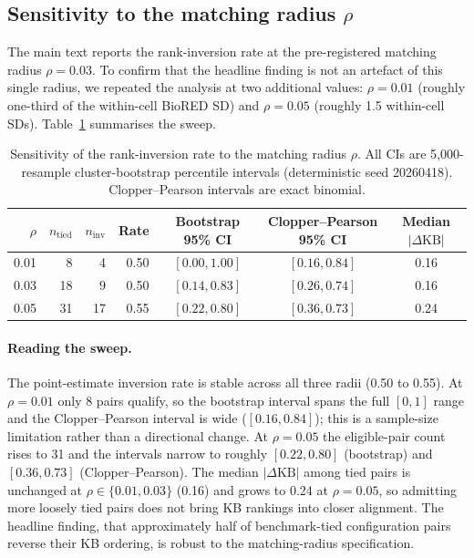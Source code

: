 \subsection{Sensitivity to the matching radius $\rho$}
\label{supp:rho-sweep}

The main text reports the rank-inversion rate at the
pre-registered matching radius $\rho = 0.03$. To confirm that the
headline finding is not an artefact of this single radius, we
repeated the analysis at two additional values: $\rho = 0.01$
(roughly one-third of the within-cell BioRED SD) and $\rho = 0.05$
(roughly 1.5 within-cell SDs). Table~\ref{tab:s8-rho-sweep}
summarises the sweep.

\begin{table}[H]
\centering
\caption{Sensitivity of the rank-inversion rate to the
matching radius $\rho$. All CIs are 5{,}000-resample
cluster-bootstrap percentile intervals (deterministic seed
20260418). Clopper--Pearson intervals are exact binomial.}
\label{tab:s8-rho-sweep}
\small
\begin{tabular}{@{}rrrrccc@{}}
\toprule
\textbf{$\rho$} & \textbf{$n_\text{tied}$}
& \textbf{$n_\text{inv}$} & \textbf{Rate}
& \textbf{Bootstrap 95\% CI}
& \textbf{Clopper--Pearson 95\% CI}
& \textbf{Median $|\Delta\text{KB}|$} \\
\midrule
0.01 &  8 &  4 & 0.50 & $[0.00, 1.00]$ & $[0.16, 0.84]$ & 0.16 \\
0.03 & 18 &  9 & 0.50 & $[0.14, 0.83]$ & $[0.26, 0.74]$ & 0.16 \\
0.05 & 31 & 17 & 0.55 & $[0.22, 0.80]$ & $[0.36, 0.73]$ & 0.24 \\
\bottomrule
\end{tabular}
\end{table}

\paragraph{Reading the sweep.}
The point-estimate inversion rate is stable across all three radii
(0.50 to 0.55). At $\rho = 0.01$ only 8 pairs qualify, so the
bootstrap interval spans the full $[0, 1]$ range and the
Clopper--Pearson interval is wide ($[0.16, 0.84]$); this is a
sample-size limitation rather than a directional change. At
$\rho = 0.05$ the eligible-pair count rises to 31 and the intervals
narrow to roughly $[0.22, 0.80]$ (bootstrap) and $[0.36, 0.73]$
(Clopper--Pearson). The median $|\Delta\text{KB}|$ among tied pairs
is unchanged at $\rho \in \{0.01, 0.03\}$ (0.16) and grows to 0.24
at $\rho = 0.05$, so admitting more loosely tied pairs does not
bring KB rankings into closer alignment. The headline finding, that
approximately half of benchmark-tied configuration pairs reverse
their KB ordering, is robust to the matching-radius specification.